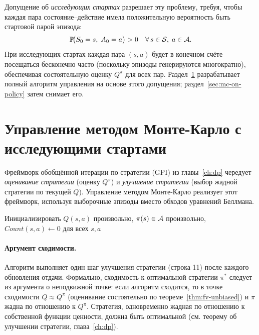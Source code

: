 Допущение об \emph{исследующих стартах} разрешает эту проблему, требуя, чтобы каждая пара состояние--действие имела положительную вероятность быть стартовой парой эпизода:
\[
  \mathbb{P}\!\bigl(S_0 = s,\; A_0 = a\bigr) > 0 \quad \forall\, s \in \mathcal{S},\; a \in \mathcal{A}.
\]
При исследующих стартах каждая пара $(s, a)$ будет в конечном счёте посещаться бесконечно часто (поскольку эпизоды генерируются многократно), обеспечивая состоятельную оценку $Q^\pi$ для всех пар.  Раздел~\ref{sec:mc-es} разрабатывает полный алгоритм управления на основе этого допущения; раздел~\ref{sec:mc-on-policy} затем снимает его.


\section{Управление методом Монте-Карло с исследующими стартами}
\label{sec:mc-es}

Фреймворк обобщённой итерации по стратегии (GPI) из главы~\ref{ch:dp} чередует \emph{оценивание стратегии} (оценку $Q^\pi$) и \emph{улучшение стратегии} (выбор жадной стратегии по текущей $Q$).  Управление методом Монте-Карло реализует этот фреймворк, используя выборочные эпизоды вместо обходов уравнений Беллмана.

\begin{algorithm}[ht]
\caption{Управление методом МК с исследующими стартами (MC-ES)}
\label{alg:mc-es}
Инициализировать $Q(s,a)$ произвольно, $\pi(s) \in \mathcal{A}$ произвольно, $\mathit{Count}(s,a) \leftarrow 0$ для всех $s, a$\;
\end{algorithm}

\paragraph{Аргумент сходимости.}
Алгоритм выполняет один шаг улучшения стратегии (строка 11) после каждого обновления отдачи.  Формально, сходимость к оптимальной стратегии $\pi^*$ следует из аргумента о неподвижной точке: если алгоритм сходится, то в точке сходимости $Q \approx Q^{\pi}$ (оценивание состоятельно по теореме~\ref{thm:fv-unbiased}) и $\pi$ жадна по отношению к $Q^{\pi}$.  Стратегия, одновременно жадная по отношению к собственной функции ценности, должна быть оптимальной (см. теорему об улучшении стратегии, глава~\ref{ch:dp}).

